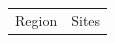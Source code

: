 \documentclass[journal abbreviation, manuscript]{copernicus}
\begin{document}
\begin{table}
 \scriptsize
 \begin{tabularx}{\textwidth}{lX}
  \tophline
  Region   & Sites                                                                                                                                                                                                                                                                                                                                                                                                                                                                                                                                                                                                                                                                                                                                                                                                                                                                                                                                                                                                                                                                                                                                                                                                                                                                                                                                                                                                                                                                                                                                                                                                                                                                                                                                                                                                                                                                                                                                                                                                                                                                                                                                                                                                                                                                                                                                                                                                                                                                                                                                                                                                                                                                                                                                                                                                                                                                                                                                                                                                                                                                                                                                                                                                                                             
\end{tabularx}
\end{table}
\end{document}

